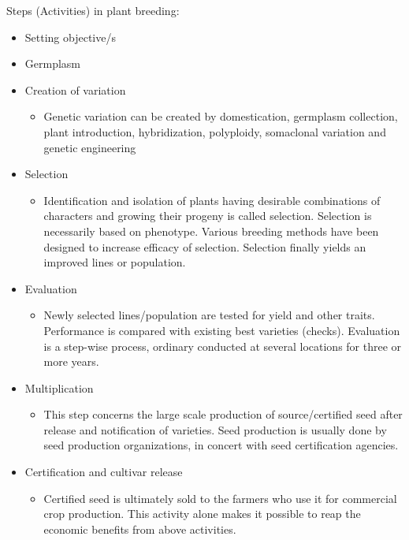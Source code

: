 \documentclass[11pt,ignorenonframetext,aspectratio=169]{beamer}
\providecommand{\tightlist}{%
  \setlength{\itemsep}{0pt}\setlength{\parskip}{0pt}}
\begin{document}
\begin{frame}{Steps (Activities) in plant breeding:}
\small

\begin{itemize}
\tightlist
\item
  Setting objective/s
\item
  Germplasm
\item
  Creation of variation

  \begin{itemize}
  \footnotesize
  \item Genetic variation can be created by domestication, germplasm collection, plant introduction, hybridization, polyploidy, somaclonal variation and genetic engineering
  \end{itemize}
\item
  Selection

  \begin{itemize}
  \footnotesize
  \item Identification and isolation of plants having desirable combinations of characters and growing their progeny is called selection. Selection is necessarily based on phenotype. Various breeding methods have been designed to increase efficacy of selection. Selection finally yields an improved lines or population.
  \end{itemize}
\end{itemize}
\end{frame}

\begin{frame}{}
\protect\hypertarget{section-16}{}
\begin{itemize}
\tightlist
\item
  Evaluation

  \begin{itemize}
  \footnotesize
  \item Newly selected lines/population are tested for yield and other traits. Performance is compared with existing best varieties (checks). Evaluation is a step-wise process, ordinary conducted at several locations for three or more years.
  \end{itemize}
\item
  Multiplication

  \begin{itemize}
  \footnotesize
  \item This step concerns the large scale production of source/certified seed after release and notification of varieties. Seed production is usually done by seed production organizations, in concert with seed certification agencies.
  \end{itemize}
\item
  Certification and cultivar release

  \begin{itemize}
  \footnotesize
  \item Certified seed is ultimately sold to the farmers who use it for commercial crop production. This activity alone makes it possible to reap the economic benefits from above activities.
  \end{itemize}
\end{itemize}
\end{frame}
\end{document}
